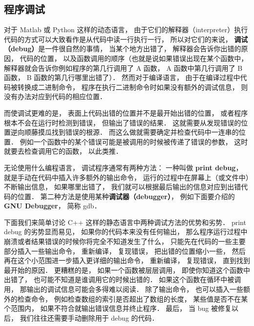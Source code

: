 
\begin{issues}
\issueTODO
{}
\end{issues}

\subsection{程序调试}

对于 Matlab 或 Python 这样的动态语言， 由于它们的解释器（interpreter）执行代码的方式可以大致看作是从代码中读一行执行一行， 所以对它们的来说， \textbf{调试（debug）}是一件很自然的事情， 当某个地方出错了， 解释器会告诉你出错的原因， 代码的位置， 以及函数调用的顺序（也就是说如果错误出现在某个函数中， 解释器就会告诉你例如程序的第几行调用了 A 函数， A 函数中第几行调用了 B 函数， B 函数的第几行哪里出错了）． 然而对于编译语言， 由于在编译过程中代码被转换成二进制命令， 程序在执行二进制命令时如果没有额外的调试信息， 则没有办法对应到代码的相应位置．

而使调试更难的是， 表面上代码出错的位置并不是最开始出错的位置， 或者程序根本不会在运行时检测到错误， 但输出了错误的结果． 这就需要从发现错误的位置逆向顺藤摸瓜找到错误的根源． 而这么做就需要确定并检查代码中一连串的位置． 例如一个函数中的某个错误可能是被调用的时候被传递了错误的参数， 这时就要去检查调用它的函数， 以此类推．

无论使用什么编程语言， 调试程序通常有两种方法： 一种叫做 \textbf{print debug}， 就是手动在代码中插入许多额外的输出命令， 运行的过程中在屏幕上（或文件中）不断输出信息， 如果哪里出错了， 我们就可以根据最后输出的信息对应到出错代码的位置． 第二种方法是使用某种\textbf{调试器（debugger）}， 例如下面要介绍的 \textbf{GNU Debugger}， 简称 gdb．

下面我们来简单讨论 C++ 这样的静态语言中两种调试方法的优势和劣势． print debug 的劣势显而易见， 如果你的代码本来没有任何输出， 那么程序运行过程中崩溃或者结果错误的时候你将完全不知道发生了什么， 只能先在代码的一些主要部分插入一些输出命令， 重新编译， 复现错误， 把出错的位置缩小一些， 然后再在这个小范围进一步插入更详细的输出命令， 重新编译， 复现错误， 直到找到最开始的原因． 更糟糕的是， 如果一个函数被层层调用， 即使你知道这个函数中出错了， 也可能不知道是谁调用它的时候出错的． 如果这个函数在循环中被调用， 那输出的调试信息可能会多得难以阅读． 除了输出命令， 也可以插入一些额外的检查命令， 例如检查数组的索引是否超出了数组的长度， 某些值是否不在某个范围内， 如果不符合就输出错误信息并终止程序． 最后， 当 bug 被修复以后， 我们往往还需要手动删除用于 debug 的代码．

